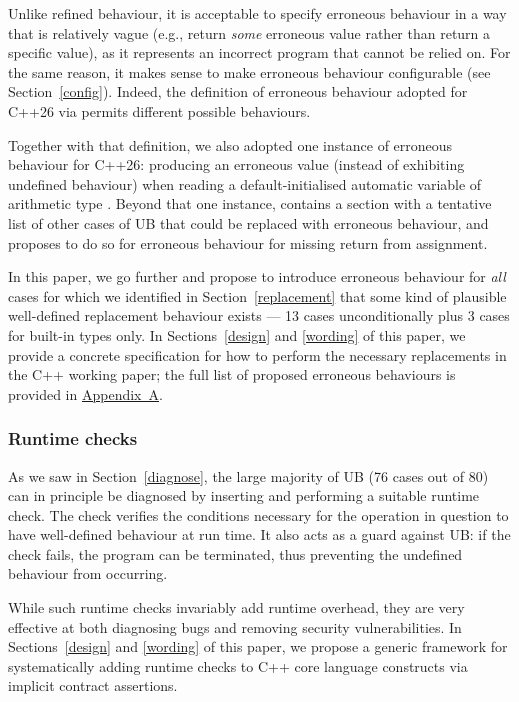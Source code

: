 {Unlike refined behaviour, it is acceptable to specify erroneous behaviour in a way that is relatively vague (e.g., return \emph{some} erroneous value rather than return a specific value), as it represents an incorrect program that cannot be relied on. For the same reason, it makes sense to make erroneous behaviour configurable (see Section~\ref{config}). Indeed, the definition of erroneous behaviour adopted for C++26 via \cite{P2795R5} permits different possible behaviours.

Together with that definition, we also adopted one instance of erroneous behaviour for C++26: producing an erroneous value (instead of exhibiting undefined behaviour) when reading a default-initialised automatic variable of arithmetic type \cite{P2795R5}. Beyond that one instance, \cite{P2795R5} contains a section with a tentative list of other cases of UB that could be replaced with erroneous behaviour, and \cite{P2973R0} proposes to do so for erroneous behaviour for missing return from assignment.

In this paper, we go further and propose to introduce erroneous behaviour for \emph{all} cases for which we identified in Section~\ref{replacement} that some kind of plausible well-defined replacement behaviour exists --- 13 cases unconditionally plus 3 cases for built-in types only. In Sections~\ref{design} and \ref{wording} of this paper, we provide a concrete specification for how to perform the necessary replacements in the C++ working paper; the full list of proposed erroneous behaviours is provided in \hyperref[appendix]{Appendix~A}.

\subsubsection{Runtime checks}
\label{checks}

As we saw in Section~\ref{diagnose}, the large majority of UB (76 cases out of 80) can in principle be diagnosed by inserting and performing a suitable runtime check. The check verifies the conditions necessary for the operation in question to have well-defined behaviour at run time. It also acts as a guard against UB: if the check fails, the program can be terminated, thus preventing the undefined behaviour from occurring.

While such runtime checks invariably add runtime overhead, they are very effective at both diagnosing bugs and removing security vulnerabilities. In Sections~\ref{design} and \ref{wording} of this paper, we propose a generic framework for systematically adding runtime checks to C++ core language constructs via implicit contract assertions.

}

